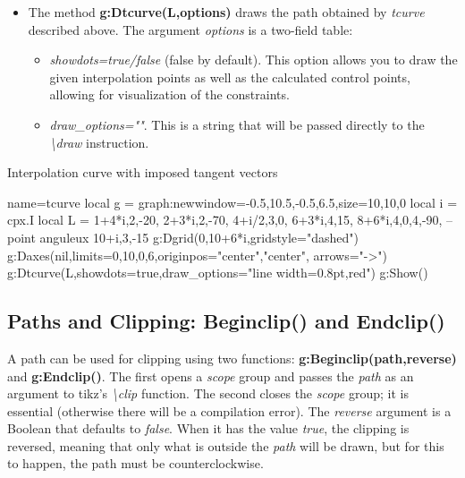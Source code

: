 \begin{itemize}
Two consecutive points will be connected by a Bézier curve; the function calculates the control points to obtain the desired tangent vectors.

    \item The method \textbf{g:Dtcurve(L,options)} draws the path obtained by \emph{tcurve} described above. The argument \emph{options} is a two-field table:
\begin{itemize}
    \item \emph{showdots=true/false} (false by default). This option allows you to draw the given interpolation points as well as the calculated control points, allowing for visualization of the constraints.
    \item \emph{draw\_options=""}. This is a string that will be passed directly to the \emph{\textbackslash draw} instruction.
\end{itemize}
\end{itemize}

\begin{demo}{Interpolation curve with imposed tangent vectors}
\begin{luadraw}{name=tcurve}
local g = graph:new{window={-0.5,10.5,-0.5,6.5},size={10,10,0}}
local i = cpx.I
local L = {
    1+4*i,{2,-20},
    2+3*i,{2,-70},
    4+i/2,{3,0},
    6+3*i,{4,15},
    8+6*i,{4,0,4,-90}, -- point anguleux
    10+i,{3,-15}}
g:Dgrid({0,10+6*i},{gridstyle="dashed"})
g:Daxes(nil,{limits={{0,10},{0,6}},originpos={"center","center"}, arrows="->"})
g:Dtcurve(L,{showdots=true,draw_options="line width=0.8pt,red"})
g:Show()
\end{luadraw}
\end{demo}

\subsection{Paths and Clipping: Beginclip() and Endclip()}

A path can be used for clipping using two functions: \textbf{g:Beginclip(path,reverse)} and \textbf{g:Endclip()}. The first opens a \emph{scope} group and passes the \emph{path} as an argument to tikz's \emph{\textbackslash clip} function. The second closes the \emph{scope} group; it is essential (otherwise there will be a compilation error).
The \emph{reverse} argument is a Boolean that defaults to \emph{false}. When it has the value \emph{true}, the clipping is reversed, meaning that only what is outside the \emph{path} will be drawn, but for this to happen, the path must be counterclockwise.

